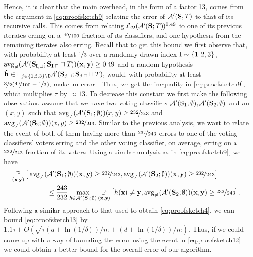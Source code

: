 Hence, it is clear that the main overhead, in the form of a factor 13, comes from the argument in \cref{eq:proofsketch9} relating the error of $ \mathcal{A}'(\mathbf{S},T) $ to that of its recursive calls.
This comes from relating $ \operatorname{\mathcal{L}}_{\mathcal{D}}(\mathcal{A}'(\mathbf{S};T))^{0.49} $ to one of its previous iterates erring on a $\nicefrac{49}{100}$-fraction of its classifiers, and one hypothesis from the remaining iterates also erring. 
Recall that to get this bound we first observe that, with probability at least $ \nicefrac{1}{3}$ over a randomly drawn index $ \mathbf{I}\sim\left\{  1,2,3\right\} ,$ $ \operatorname{\mathrm{avg}_{\not=}}(\mathcal{A}'(\mathbf{S}_{\mathbf{I},\sqcup};\mathbf{S}_{\mathbf{I},\sqcap}\sqcap T))(\mathbf{x},\mathbf{y}) \geq 0.49$ and a random hypothesis $\mathbf{\hat{h}}\in \sqcup_{j\in\{  1,2,3\}\backslash \mathbf{I} } \mathcal{A}'(\mathbf{S}_{j,\sqcup};\mathbf{S}_{j,\sqcap}\sqcup T),$ would, with probability at least  $ \nicefrac{3}{2}(\nicefrac{49}{100}-\nicefrac{1}{3}),$ make an error . Thus, we get the inequality in \cref{eq:proofsketch9}, which multiplies $ \tau $ by $ \approx 13.$
To decrease this constant we first make the following observation: assume that we have two voting classifiers $ \mathcal{A}'(\mathbf{S}_{1};\emptyset),  \mathcal{A}'(\mathbf{S}_{2};\emptyset) $ and an $ (x,y) $ such that $ \operatorname{\mathrm{avg}_{\not=}}( \mathcal{A}'(\mathbf{S}_{1};\emptyset))(x,y)\geq \nicefrac{232}{243} $ and $ \operatorname{\mathrm{avg}_{\not=}}( \mathcal{A}'(\mathbf{S}_{2};\emptyset))(x,y)\geq \nicefrac{232}{243}$. Similar to the previous analysis, we want to relate the event of both of them having more than $\nicefrac{232}{243}  $ errors to one of the voting classifiers' voters erring and the other voting classifier, on average, erring on  a $ \nicefrac{232}{243} $-fraction of its voters. 
Using a similar analysis as
in \cref{eq:proofsketch9}, we have 
\begin{align}
 \operatorname*{\mathbb{P}}_{(\mathbf{x},\mathbf{y})}\big[\operatorname{\mathrm{avg}_{\not=}}( & \mathcal{A}'(\mathbf{S}_{1};\emptyset))(\mathbf{x},\mathbf{y})\geq \nicefrac{232}{243}, \operatorname{\mathrm{avg}_{\not=}}( \mathcal{A}'(\mathbf{S}_{2};\emptyset))(\mathbf{x},\mathbf{y})\geq \nicefrac{232}{243}\big]\label{eq:proofsketch12}
 \\
 &\leq \frac{243}{232}\max_{h\in \mathcal{A}'(\mathbf{S}_{1};\emptyset)}\operatorname*{\mathbb{P}}_{(\mathbf{x},\mathbf{y})}\left[h(\mathbf{x})\not=\mathbf{y}, \operatorname{\mathrm{avg}_{\not=}}( \mathcal{A}'(\mathbf{S}_{2};\emptyset))(\mathbf{x},\mathbf{y})\geq \nicefrac{232}{243}\right].\label{eq:proofsketch13}
\end{align}  
Following a similar approach to that used to obtain \cref{eq:proofsketch4}, we can bound \cref{eq:proofsketch13} by
$1.1\tau+ O(\sqrt{\tau(d+\ln{\left(1/\delta \right)})/m}+(d+\ln{\left(1/\delta \right)})/m)$. 
Thus, if we could come up with a way of bounding the error using the event in \cref{eq:proofsketch12} we could obtain a better bound for the overall error of our algorithm.

